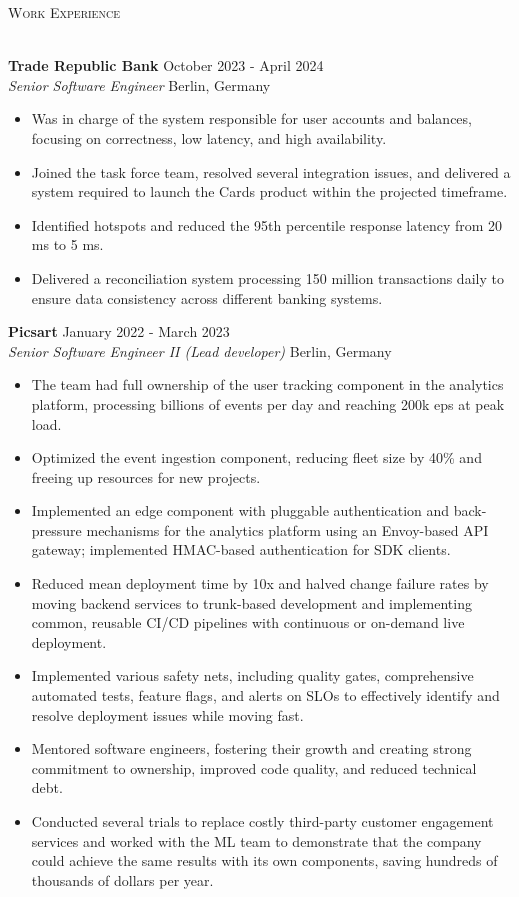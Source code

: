 \documentclass[a4paper]{article}
\newcommand{\lineunder} {
    \vspace*{-8pt} \\
    \hspace*{-18pt} \hrulefill \\
}
\newcommand{\header} [1] {
        {\hspace*{-18pt}\vspace*{6pt} \textsc{#1}}
    \vspace*{-6pt} \lineunder
}
\newcommand{\employer} [4] {
    \textbf{#1} \hfill {#3} \\
    \textit{#2} \hfill {#4} \\
    \vspace{0mm}
}
\begin{document}
    \header{Work Experience}
    \vspace{1mm}

    \employer{Trade Republic Bank}{Senior Software Engineer}{October 2023 - April 2024}{Berlin, Germany}
    \begin{itemize}[itemsep=-1mm]
        \item Was in charge of the system responsible for user accounts and balances, focusing on correctness, low latency, and high availability.
        \item Joined the task force team, resolved several integration issues, and delivered a system required to launch the Cards product within the projected timeframe.
        \item Identified hotspots and reduced the 95th percentile response latency from 20 ms to 5 ms.
        \item Delivered a reconciliation system processing 150 million transactions daily to ensure data consistency across different banking systems.
    \end{itemize}

    \employer{Picsart}{Senior Software Engineer II (Lead developer)}{January 2022 - March 2023}{Berlin, Germany}
    \begin{itemize}[itemsep=-1mm]
        \item The team had full ownership of the user tracking component in the analytics platform, processing billions
        of events per day and reaching 200k eps at peak load.
        \item Optimized the event ingestion component, reducing fleet size by 40\% and freeing up resources for new projects.
        \item Implemented an edge component with pluggable authentication and back-pressure mechanisms for the analytics platform
        using an Envoy-based API gateway; implemented HMAC-based authentication for SDK clients.
        \item Reduced mean deployment time by 10x and halved change failure rates
        by moving backend services to trunk-based development and implementing common, reusable CI/CD pipelines with
        continuous or on-demand live deployment.
        \item Implemented various safety nets, including quality gates, comprehensive automated tests,
        feature flags, and alerts on SLOs to effectively identify and resolve deployment issues while moving fast.
        \item Mentored software engineers, fostering their growth and creating strong commitment to ownership,
        improved code quality, and reduced technical debt.
        \item Conducted several trials to replace costly third-party customer engagement services
        and worked with the ML team to demonstrate that the company could achieve the same results with its own components,
        saving hundreds of thousands of dollars per year.
    \end{itemize}
\end{document}
